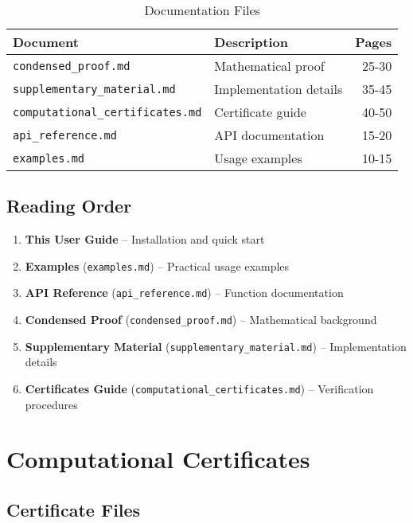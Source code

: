 \documentclass[11pt,a4paper]{article}
\newcommand{\file}[1]{\texttt{#1}}
\begin{document}
\begin{table}[H]
\centering
\caption{Documentation Files}
\begin{tabular}{@{}llr@{}}
\toprule
\textbf{Document} & \textbf{Description} & \textbf{Pages} \\
\midrule
\file{condensed\_proof.md} & Mathematical proof & 25-30 \\
\file{supplementary\_material.md} & Implementation details & 35-45 \\
\file{computational\_certificates.md} & Certificate guide & 40-50 \\
\file{api\_reference.md} & API documentation & 15-20 \\
\file{examples.md} & Usage examples & 10-15 \\
\bottomrule
\end{tabular}
\end{table}

\subsection{Reading Order}

\begin{enumerate}[leftmargin=*]
\item \textbf{This User Guide} -- Installation and quick start
\item \textbf{Examples} (\file{examples.md}) -- Practical usage examples
\item \textbf{API Reference} (\file{api\_reference.md}) -- Function documentation
\item \textbf{Condensed Proof} (\file{condensed\_proof.md}) -- Mathematical background
\item \textbf{Supplementary Material} (\file{supplementary\_material.md}) -- Implementation details
\item \textbf{Certificates Guide} (\file{computational\_certificates.md}) -- Verification procedures
\end{enumerate}

\section{Computational Certificates}

\subsection{Certificate Files}
\end{document}
